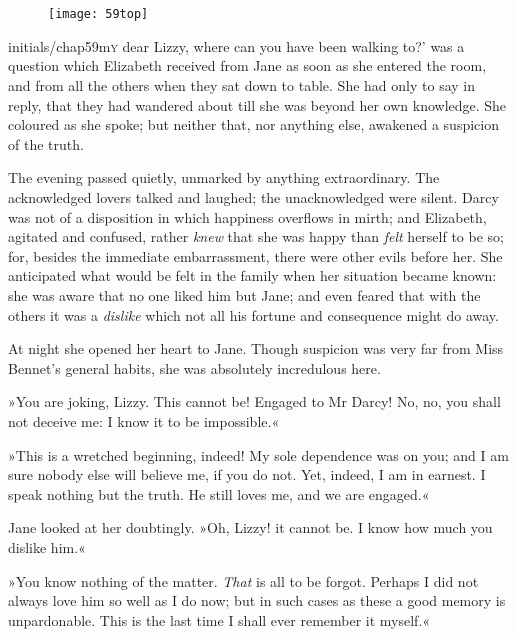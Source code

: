 \chapter[Chapter \thechapter]{}
	

\begin{figure}[t!]
\centering
\texttt{[image: 59top]}
\end{figure}


\lettrine[lines=6,image=true,ante=`]{initials/chap59m}{y} dear Lizzy, where can you have been walking to?' was a question which Elizabeth received from Jane as soon as she entered the room, and from all the others when they sat down to table. She had only to say in reply, that they had wandered about till she was beyond her own knowledge. She coloured as she spoke; but neither that, nor anything else, awakened a suspicion of the truth.

The evening passed quietly, unmarked by anything extraordinary. The acknowledged lovers talked and laughed; the unacknowledged were silent. Darcy was not of a disposition in which happiness overflows in mirth; and Elizabeth, agitated and confused, rather \textit{knew} that she was happy than \textit{felt} herself to be so; for, besides the immediate embarrassment, there were other evils before her. She anticipated what would be felt in the family when her situation became known: she was aware that no one liked him but Jane; and even feared that with the others it was a \textit{dislike} which not all his fortune and consequence might do away.

At night she opened her heart to Jane. Though suspicion was very far from Miss Bennet's general habits, she was absolutely incredulous here.

»You are joking, Lizzy. This cannot be! Engaged to Mr Darcy! No, no, you shall not deceive me: I know it to be impossible.«

»This is a wretched beginning, indeed! My sole dependence was on you; and I am sure nobody else will believe me, if you do not. Yet, indeed, I am in earnest. I speak nothing but the truth. He still loves me, and we are engaged.«

Jane looked at her doubtingly. »Oh, Lizzy! it cannot be. I know how much you dislike him.«

»You know nothing of the matter. \textit{That} is all to be forgot. Perhaps I did not always love him so well as I do now; but in such cases as these a good memory is unpardonable. This is the last time I shall ever remember it myself.«

